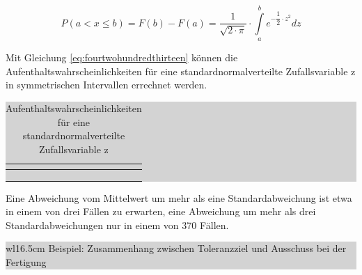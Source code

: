 \begin{equation}\label{eq:fourtwohundredthirteen}
P\left(a<x\le b\right)=F(b)-F(a)=\dfrac{1}{\sqrt{2\cdot \pi}} \cdot \int\limits _{a}^{b}e^{-\dfrac{1}{2} \cdot z^{2}}  dz
\end{equation}

\noindent Mit Gleichung \eqref{eq:fourtwohundredthirteen} k\"{o}nnen die Aufenthaltswahrscheinlichkeiten f\"{u}r eine standardnormalverteilte Zufallsvariable z in symmetrischen Intervallen errechnet werden.

\begin{table}[H]
\caption{Aufenthaltswahrscheinlichkeiten f\"{u}r eine standardnormalverteilte Zufallsvariable z}
\setlength{\fboxsep}{0pt}%
\colorbox{lightgray}{%
%
\begin{tabular}{| c | c |}
\hline
\parbox[c][0.28in][c]{3.3in}{\smallskip\centering\textbf{\selectfont{Intervall}}} & 
\parbox[c][0.28in][c]{3.3in}{\smallskip\centering\textbf{\selectfont{Aufenthaltswahrscheinlichkeit}}}\\ \hline

\parbox[c][0.3in][c]{3.3in}{\centering{}} &
\parbox[c][0.3in][c]{3.3in}{\centering{}\selectfont{$\approx 68.2689 \%$}} \\ \hline

\parbox[c][0.3in][c]{3.3in}{\centering{}} &
\parbox[c][0.3in][c]{3.3in}{\centering{}\selectfont{$\approx 95.4500 \%$}} \\ \hline

\parbox[c][0.3in][c]{3.3in}{\centering{}} &
\parbox[c][0.3in][c]{3.3in}{\centering{}\selectfont{$\approx 99.7300 \%$}} \\ \hline

\end{tabular}%
}\bigskip
\label{tab:fourfourteen}
\end{table}

\noindent Eine Abweichung vom Mittelwert um mehr als eine Standardabweichung ist etwa in einem von drei F\"{a}llen zu erwarten, eine Abweichung um mehr als drei Standardabweichungen nur in einem von 370 F\"{a}llen.\bigskip

\noindent
\colorbox{lightgray}{%
%
\renewcommand\arraystretch{0.6}%
\begin{tabular}{ wl{16.5cm} }
{\selectfont
\noindent
Beispiel: Zusammenhang zwischen Toleranzziel und Ausschuss bei der Fertigung}
\end{tabular}%
}\bigskip

